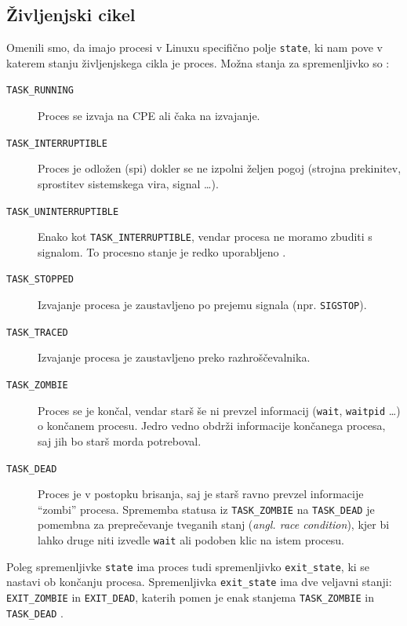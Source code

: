 \documentclass[a4paper,12pt,openright]{book}
\begin{document}
\subsection{Življenjski cikel} \label{ssec:linux_process:lifecycle} %

Omenili smo, da imajo procesi v Linuxu specifično polje \texttt{state}, ki nam pove v katerem stanju življenjskega cikla je proces.
Možna stanja za spremenljivko so \cite{Bovet_Cesati_2005}:
\begin{description}
	\item[\texttt{TASK\_RUNNING}] Proces se izvaja na CPE ali čaka na izvajanje.
	\item[\texttt{TASK\_INTERRUPTIBLE}] Proces je odložen (spi) dokler se ne izpolni željen pogoj (strojna prekinitev, sprostitev sistemskega vira, signal \dots).
	\item[\texttt{TASK\_UNINTERRUPTIBLE}] Enako kot \texttt{TASK\_INTERRUPTIBLE}, vendar procesa ne moramo zbuditi s signalom.
	To procesno stanje je redko uporabljeno \cite{Bovet_Cesati_2005}.
	\item[\texttt{TASK\_STOPPED}] Izvajanje procesa je zaustavljeno po prejemu signala (npr. \texttt{SIGSTOP}).
	\item[\texttt{TASK\_TRACED}] Izvajanje procesa je zaustavljeno preko razhroščevalnika.
	\item[\texttt{TASK\_ZOMBIE}] Proces se je končal, vendar starš še ni prevzel informacij (\texttt{wait}, \texttt{waitpid} \dots) o končanem procesu.
	Jedro vedno obdrži informacije končanega procesa, saj jih bo starš morda potreboval.
	\item[\texttt{TASK\_DEAD}] Proces je v postopku brisanja, saj je starš ravno prevzel informacije ``zombi'' procesa.
	Sprememba statusa iz \texttt{TASK\_ZOMBIE} na \texttt{TASK\_DEAD} je pomembna za preprečevanje tveganih stanj (\textit{angl. race condition}), kjer bi lahko druge niti izvedle \texttt{wait} ali podoben klic na istem procesu.
\end{description}

Poleg spremenljivke \texttt{state} ima proces tudi spremenljivko \texttt{exit\_state}, ki se nastavi ob končanju procesa.
Spremenljivka \texttt{exit\_state} ima dve veljavni stanji: \texttt{EXIT\_ZOMBIE} in \texttt{EXIT\_DEAD}, katerih pomen je enak stanjema \texttt{TASK\_ZOMBIE} in \texttt{TASK\_DEAD} \cite{Bovet_Cesati_2005}.
\end{document}

